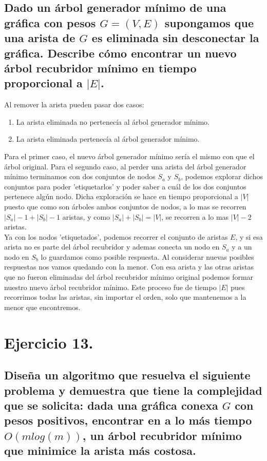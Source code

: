 \documentclass[12pt]{article}
\begin{document}
\subsection{Dado un árbol generador mínimo de una gráfica con pesos $G=(V,E)$ supongamos que una arista de $G$ es eliminada sin desconectar la gráfica. Describe cómo encontrar un nuevo árbol recubridor mínimo en tiempo proporcional a $|E|$.}
Al remover la arista pueden pasar dos casos:
\begin{enumerate}
\item La arista eliminada no pertenecía al árbol generador mínimo.
\item La arista eliminada pertenecía al árbol generador mínimo.
\end{enumerate}
Para el primer caso, el nuevo árbol generador mínimo sería el mismo con que el árbol original.
Para el segundo caso, al perder una arista del árbol generador mínimo terminamos con dos conjuntos de nodos $S_a$ y $S_b$, podemos explorar dichos conjuntos para poder 'etiquetarlos' y poder saber a cuál de los dos conjuntos pertenece algún nodo. Dicha exploración se hace en tiempo proporcional a $|V|$ puesto que como son árboles ambos conjuntos de nodos, a lo mas se recorren $|S_a|-1 + |S_b|-1$ aristas, y como $|S_a| + |S_b| = |V|$, se recorren a lo mas $|V|-2$ aristas.\\ 
Ya con los nodos 'etiquetados', podemos recorrer el conjunto de aristas $E$, y si esa arista no es parte del árbol recubridor y ademas conecta un nodo en $S_a$ y a un nodo en $S_b$ lo guardamos como posible respuesta. Al considerar nuevas posibles respuestas nos vamos quedando con la menor. Con esa arista y las otras aristas que no fueron eliminadas del árbol recubridor mínimo original podemos formar nuestro nuevo árbol recubridor mínimo. Este proceso fue de tiempo $|E|$ pues recorrimos todas las aristas, sin importar el orden, solo que mantenemos a la menor que encontremos.
\section{Ejercicio 13.}
\subsection{Diseña un algoritmo que resuelva el siguiente problema y demuestra que tiene la complejidad que se solicita: dada una gráfica conexa $G$ con pesos positivos, encontrar en a lo más tiempo $O(mlog(m))$, un árbol recubridor mínimo que minimice la arista más costosa.}
\paragraph{}
\end{document}
